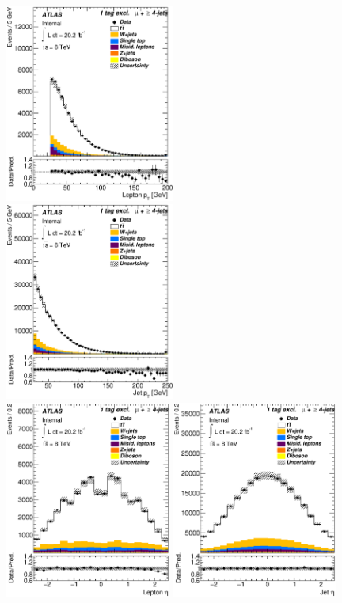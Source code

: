 \begin{figure}[!hb]
\begin{center}

		\includegraphics[height=65mm]{chapters/whel/figures/control_Plots2/bTag_1excl/LeptonPt_mu}
		\includegraphics[height=65mm]{chapters/whel/figures/control_Plots2/bTag_1excl/JetPt_mu}\\
		\includegraphics[height=65mm]{chapters/whel/figures/control_Plots2/bTag_1excl/LeptonEta_mu}
		\includegraphics[height=65mm]{chapters/whel/figures/control_Plots2/bTag_1excl/JetEta_mu}\\

\end{center}
\end{figure}
